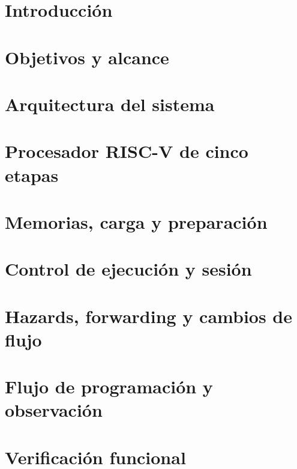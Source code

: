 \documentclass[12pt,a4paper,openany]{book}
\begin{document}

\begingroup
\pagestyle{plain}
\tableofcontents
\thispagestyle{plain}
\endgroup
\newpage

\chapter{Introducción}\label{chap:introduccion}


\chapter{Objetivos y alcance}\label{chap:objetivos}


\chapter{Arquitectura del sistema}\label{chap:arquitectura}


\chapter{Procesador RISC-V de cinco etapas}\label{chap:procesador}


\chapter{Memorias, carga y preparación}\label{chap:memorias}


\chapter{Control de ejecución y sesión}\label{chap:control-ejecucion}


\chapter{Hazards, forwarding y cambios de flujo}\label{chap:hazards}


\chapter{Flujo de programación y observación}\label{chap:flujo-software}


\chapter{Verificación funcional}\label{chap:verificacion}

\end{document}

